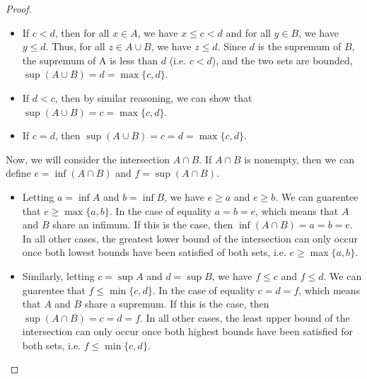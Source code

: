 \documentclass[12pt]{article}
\begin{document}
\begin{proof}
    \begin{itemize}
      \item If $c < d$, then for all $x \in A$, we have $x \leq c < d$ and for all $y \in B$, we have $y \leq d$. Thus, for all $z \in A \cup B$, we have $z \leq d$. Since $d$ is the supremum of $B$, the supremum of A is less than $d$ (i.e. $c < d$), and the two sets are bounded, $\sup(A \cup B) = d = \max\{c, d\}$.
      \item If $d < c$, then by similar reasoning, we can show that $\sup(A \cup B) = c = \max\{c, d\}$.
      \item If $c = d$, then $\sup(A \cup B) = c = d = \max\{c, d\}$.
    \end{itemize}
    Now, we will consider the intersection $A \cap B$. If $A \cap B$ is nonempty, then we can define $e = \inf(A \cap B)$ and $f = \sup(A \cap B)$. 
    \begin{itemize}
      \item Letting $a = \inf A$ and $b = \inf B$, we have $e \geq a$ and $e \geq b$. We can guarentee that $e \geq \max\{a, b\}$. In the case of equality $a = b = e$, which means that $A$ and $B$ share an infimum. If this is the case, then $\inf(A \cap B) = a = b = e$. In all other cases, the greatest lower bound of the intersection can only occur once both lowest bounds have been satisfied of both sets, i.e. $e \geq \max\{a, b\}$.
      \item Similarly, letting $c = \sup A$ and $d = \sup B$, we have $f \leq c$ and $f \leq d$. We can guarentee that $f \leq \min\{c, d\}$. In the case of equality $c = d = f$, which means that $A$ and $B$ share a supremum. If this is the case, then $\sup(A \cap B) = c = d = f$. In all other cases, the least upper bound of the intersection can only occur once both highest bounds have been satisfied for both sets, i.e. $f \leq \min\{c, d\}$.
    \end{itemize}


  \end{proof}

  \newpage
\end{document}
